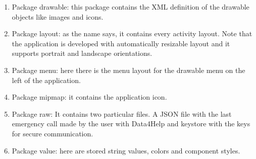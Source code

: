 \begin{enumerate}
\item Package drawable: this package contains the XML definition of the drawable objects like images and icons.
\item Package layout: as the name says, it contains every activity layout. 
Note that the application is developed with automatically resizable layout and it supports portrait and landscape orientations.
\item Package menu: here there is the menu layout for the drawable menu on the left of the application.
\item Package mipmap: it contains the application icon.
\item Package raw: It contains two particular files. A JSON file with the last emergency call made by the user with Data4Help and keystore with the keys for secure communication.
\item Package value: here are stored string values, colors and component styles. 
\end{enumerate}

